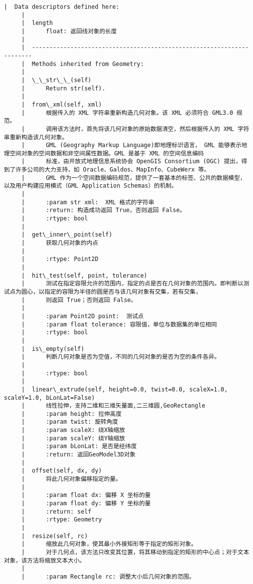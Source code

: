 \documentclass[11pt]{article}
\begin{document}
\begin{Verbatim}[commandchars=\\\{\}]
     |  Data descriptors defined here:
     |  
     |  length
     |      float: 返回线对象的长度
     |  
     |  ----------------------------------------------------------------------
     |  Methods inherited from Geometry:
     |  
     |  \_\_str\_\_(self)
     |      Return str(self).
     |  
     |  from\_xml(self, xml)
     |      根据传入的 XML 字符串重新构造几何对象。该 XML 必须符合 GML3.0 规范。
     |      调用该方法时，首先将该几何对象的原始数据清空，然后根据传入的 XML 字符串重新构造该几何对象。
     |      GML (Geography Markup Language)即地理标识语言， GML 能够表示地理空间对象的空间数据和非空间属性数据。GML 是基于 XML 的空间信息编码
     |      标准，由开放式地理信息系统协会 OpenGIS Consortium (OGC) 提出，得到了许多公司的大力支持，如 Oracle、Galdos、MapInfo、CubeWerx 等。
     |      GML 作为一个空间数据编码规范，提供了一套基本的标签、公共的数据模型，以及用户构建应用模式（GML Application Schemas）的机制。
     |      
     |      :param str xml:  XML 格式的字符串
     |      :return: 构造成功返回 True，否则返回 False。
     |      :rtype: bool
     |  
     |  get\_inner\_point(self)
     |      获取几何对象的内点
     |      
     |      :rtype: Point2D
     |  
     |  hit\_test(self, point, tolerance)
     |      测试在指定容限允许的范围内，指定的点是否在几何对象的范围内。即判断以测试点为圆心，以指定的容限为半径的圆是否与该几何对象有交集，若有交集，
     |      则返回 True；否则返回 False。
     |      
     |      :param Point2D point:  测试点
     |      :param float tolerance: 容限值，单位与数据集的单位相同
     |      :rtype: bool
     |  
     |  is\_empty(self)
     |      判断几何对象是否为空值，不同的几何对象的是否为空的条件各异。
     |      
     |      :rtype: bool
     |  
     |  linear\_extrude(self, height=0.0, twist=0.0, scaleX=1.0, scaleY=1.0, bLonLat=False)
     |      线性拉伸，支持二维和三维矢量面,二三维圆,GeoRectangle
     |      :param height: 拉伸高度
     |      :param twist: 旋转角度
     |      :param scaleX: 绕X轴缩放
     |      :param scaleY: 绕Y轴缩放
     |      :param bLonLat: 是否是经纬度
     |      :return: 返回GeoModel3D对象
     |  
     |  offset(self, dx, dy)
     |      将此几何对象偏移指定的量。
     |      
     |      :param float dx: 偏移 X 坐标的量
     |      :param float dy: 偏移 Y 坐标的量
     |      :return: self
     |      :rtype: Geometry
     |  
     |  resize(self, rc)
     |      缩放此几何对象，使其最小外接矩形等于指定的矩形对象。
     |      对于几何点，该方法只改变其位置，将其移动到指定的矩形的中心点；对于文本对象，该方法将缩放文本大小。
     |      
     |      :param Rectangle rc: 调整大小后几何对象的范围。

\end{Verbatim}
\end{document}
